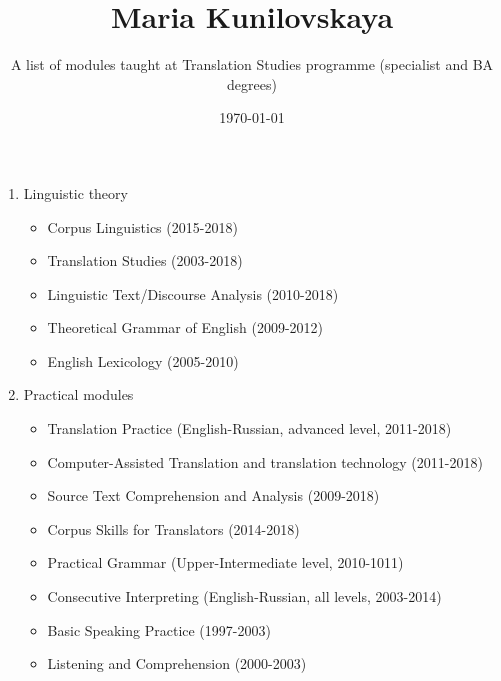 \documentclass[11pt,a4paper]{article}
\title{Maria Kunilovskaya}
\author{A list of modules taught at Translation Studies programme (specialist and BA degrees)}
\date{\today}
\begin{document}
 
	
	\clearpage
	\maketitle
	\thispagestyle{empty}
	
	\begin{enumerate}
		\item Linguistic theory
		\begin{itemize}
			\item Corpus Linguistics (2015-2018)
			\item Translation Studies (2003-2018)
			\item Linguistic Text/Discourse Analysis (2010-2018)
			\item Theoretical Grammar of English (2009-2012)
			\item English Lexicology (2005-2010)
		\end{itemize}
		\item Practical modules
		\begin{itemize}
			\item Translation Practice (English-Russian, advanced level, 2011-2018)
			\item Computer-Assisted Translation and translation technology (2011-2018)
			\item Source Text Comprehension and Analysis (2009-2018)
			\item Corpus Skills for Translators (2014-2018)
			\item Practical Grammar (Upper-Intermediate level, 2010-1011)
			\item Consecutive Interpreting (English-Russian, all levels, 2003-2014)
			\item Basic Speaking Practice (1997-2003)
			\item Listening and Comprehension (2000-2003)
		\end{itemize}
	\end{enumerate}
	
\end{document}
